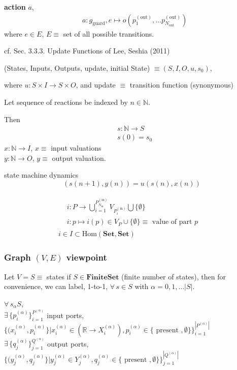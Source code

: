 \documentclass[10pt]{amsart}
\begin{document}
\begin{multicols*}{2}
\textbf{action}  $a$, 
\begin{equation}
\begin{aligned}
& a : g_{\text{guard}}, e \mapsto o( p_1^{(\text{out})}, \dots p_{N_{\text{out}}}^{(\text{out})} )
\end{aligned}
\end{equation}
where  $e\in E$, $E \equiv $ set of all possible transitions.  

cf. Sec. 3.3.3. Update Functions of Lee, Seshia (2011)  \cite{LeSe2017} 

(States, Inputs, Outputs, update, initial State) $\equiv  (S,I, O, u,s_0)$,  

where $u: S\times I \to S \times O$, and update $\equiv $ transition function (synonymous)

Let sequence of reactions be indexed by $n \in \mathbb{N}$.  

Then 
\[
\begin{aligned}
& s:\mathbb{N} \to S \\ 
& s(0) = s_0
\end{aligned}
\]
$x:\mathbb{N} \to I$, $x\equiv $ input valuations \\
$y:\mathbb{N} \to O$, $y\equiv $ output valuation.  

state machine dynamics  
\[
(s(n+1),y(n)) = u(s(n),x(n))
\]

\[
\begin{gathered}
	\begin{aligned}
	& i: P \to \bigcup_{i=1}^{ P^{(\text{in})}_{N_{\text{in}} }} V_{ P_i^{(\text{in}) } } \bigcup \lbrace \emptyset \rbrace \\ 
	& i : p \mapsto i(p) \in V_P \cup \lbrace \emptyset \rbrace \equiv \text{ value of part $p$ } 
\end{aligned} \\
i\in I \subset \text{Hom}(\textbf{Set}, \textbf{Set})
\end{gathered}
\]



\subsubsection{Graph $(V,E)$ viewpoint}

Let $V=S \equiv $ states if $S\in \textbf{FiniteSet}$ (finite number of states), then for convenience, we can label, 1-to-1, $\forall \, s \in S$ with $\alpha = 0,1,\dots |S|$.  

$\forall \, s_{\alpha} S$, \\
$\exists \, \lbrace p_i^{(\alpha)} \rbrace_{i=1}^{ P^{(\alpha)} }$ input ports, $\lbrace ( x_i^{(\alpha)}, p_i^{(\alpha)} \rbrace | x_i^{(\alpha)} \in (\mathbb{R} \to X_i^{(\alpha)} ) , p_i^{(\alpha)} \in \lbrace \text{ present } , \emptyset \rbrace \rbrace_{i=1}^{ |P^{(\alpha)}| }$    \\
$\exists \, \lbrace q_j^{(\alpha)} \rbrace_{j=1}^{ Q^{(\alpha)} }$ output ports, $\lbrace ( y_j^{(\alpha)}, q_j^{(\alpha)} \rbrace | y_j^{(\alpha)} \in Y_j^{(\alpha)}  , q_j^{(\alpha)} \in \lbrace \text{ present } , \emptyset \rbrace \rbrace_{j=1}^{ |Q^{(\alpha)}| }$  


\end{multicols*}
\end{document}
